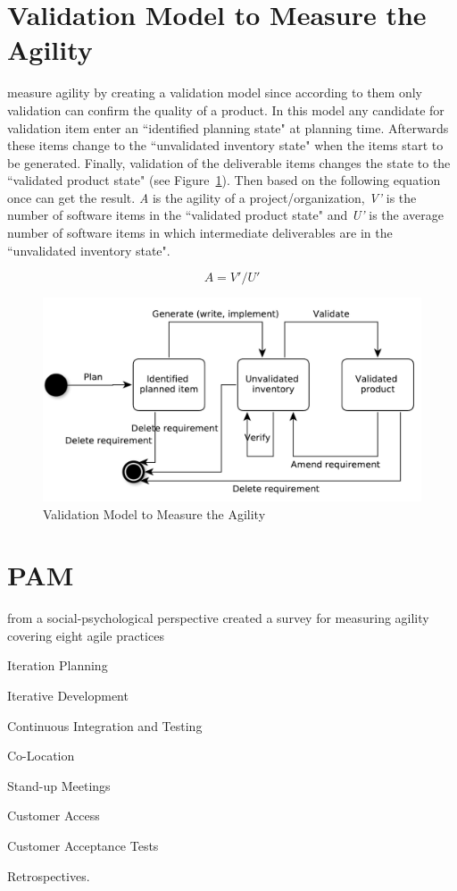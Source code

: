 \section{Validation Model to Measure the Agility}
\citet{validation_model} measure agility by creating a validation model since according to them only validation can confirm the quality of a product. In this model any candidate for validation item enter an ``identified planning state" at planning time. Afterwards these items change to the ``unvalidated inventory state" when the items start to be generated. Finally, validation of the deliverable items changes the state to the ``validated product state" (see Figure~\ref{validation_model}). Then based on the following equation once can get the result. \textit{A} is the agility of a project/organization, \textit{V'} is the number of software items in the ``validated product state" and \textit{U'} is the average number of software items in which intermediate deliverables are in the ``unvalidated inventory state".

\begin{equation} A = V'/U' \end{equation}

\begin{figure} [H]
\centerline{\includegraphics[scale=0.6]{include/relatedwork/fig/validation_model.pdf}}
\caption{Validation Model to Measure the Agility} 
\label{validation_model}
\end{figure}


\section{PAM}
\citet{pam} from a social-psychological perspective created a survey for measuring agility covering eight agile practices 
\begin{inparaenum} [a\upshape)]
\item Iteration Planning
\item Iterative Development
\item Continuous Integration and Testing
\item Co-Location
\item Stand-up Meetings
\item Customer Access
\item Customer Acceptance Tests
\item Retrospectives.
\end{inparaenum}

